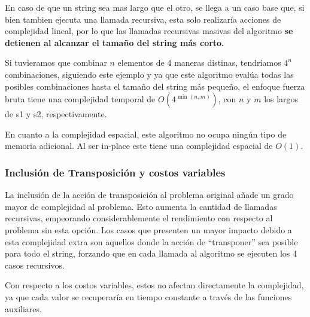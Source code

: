 En caso de que un string sea mas largo que el otro, se llega a un caso base que, si bien tambien ejecuta una llamada
recursiva, esta solo realizaría acciones de complejidad lineal, por lo que las llamadas recursivas masivas del algoritmo 
\textbf{se detienen al alcanzar el tamaño del string más corto.} 

Si tuvieramos que combinar $n$ elementos de 4 maneras distinas, tendríamos $4^n$ combinaciones, siguiendo
este ejemplo y ya que este algoritmo evalúa todas las posibles combinaciones hasta el tamaño del string más pequeño, el enfoque fuerza bruta tiene 
una complejidad temporal de $O(4^{\min(n,m)})$, con $n$ y $m$ los largos de s1 y s2, respectivamente. 

En cuanto a la complejidad espacial, este algoritmo no ocupa ningún tipo de memoria adicional. Al ser in-place este tiene una complejidad espacial
de $O(1)$.


\subsubsection{Inclusión de Transposición y costos variables}
La inclusión de la acción de transposición al problema original añade un grado mayor de complejidad al problema. Esto aumenta la cantidad de llamadas
recursivas, empeorando considerablemente el rendimiento con respecto al problema sin esta opción. Los casos que presenten un mayor impacto debido a esta 
complejidad extra son aquellos donde la acción de ``transponer'' sea posible para todo el string, forzando que en cada llamada al algoritmo se ejecuten 
los 4 casos recursivos.

Con respecto a los costos variables, estos no afectan directamente la complejidad, ya que cada valor se recuperaría en tiempo constante a través de las funciones 
auxiliares.